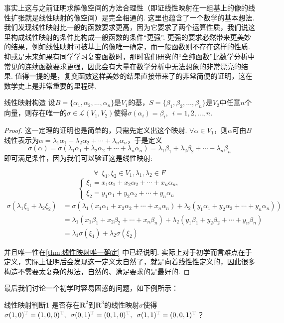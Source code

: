事实上这与之前证明求解像空间的方法合理性（即证线性映射在一组基上的像的线性扩张就是线性映射的像空间）是完全相通的. 这里也蕴含了一个数学的基本想法. 我们发现线性映射比一般的函数要求更高，因为它要求了两个运算性质，我们说这里构成线性映射的条件比构成一般函数的条件``更强''. 更强的要求必然带来更美妙的结果，例如线性映射可被基上的像唯一确定，而一般函数则不存在这样的性质. 抑或是未来如果有同学学习复变函数时，那时我们研究的``全纯函数''比数学分析中常见的连续函数要求更强，因此会有大量在数学分析中无法想象的非常漂亮的结果. 值得一提的是，复变函数这样美妙的结果直接带来了的非常简便的证明，这在数学史上是非常重要的里程碑.

\begin{theorem}{}{线性映射构造}
    设$B=\{\alpha_1,\alpha_2,\ldots,\alpha_n\}$是$V_1$的基，$S=\{\beta_1,\beta_2,\ldots,\beta_n\}$是$V_2$中任意$n$个向量，则存在唯一的$\sigma\in \mathcal{L}(V_1,V_2)$使得$\sigma(\alpha_i)=\beta_i,\enspace i=1,2,\ldots,n$.
\end{theorem}

\begin{proof}
这一定理的证明也是简单的，只需先定义出这个映射. $\forall \alpha \in V_1$，则$\alpha$可由$B$线性表示为$\alpha=\lambda_1\alpha_1+\lambda_2\alpha_2+\cdots+\lambda_n\alpha_n$，于是定义
\[\sigma(\alpha)=\sigma(\lambda_1\alpha_1+\lambda_2\alpha_2+\cdots+\lambda_n\alpha_n)=\lambda_1\beta_1+\lambda_2\beta_2+\cdots+\lambda_n\beta_n\]
即可满足条件，因为我们可以验证这是线性映射:

\[
\forall \enspace \xi_1, \xi_2 \in V_1, \lambda_1, \lambda_2 \in F
\]
\[
\begin{cases}
    \xi_1 = x_1\alpha_1+x_2\alpha_2+\cdots+x_n\alpha_n,\\
    \xi_2 = y_1\alpha_1+y_2\alpha_2+\cdots+y_n\alpha_n
\end{cases}
\]
\begin{align*}
\sigma(\lambda_1 \xi_1 + \lambda_2 \xi_2) &= \sigma(\lambda_1(x_1\alpha_1+x_2\alpha_2+\cdots+x_n\alpha_n) + \lambda_2(y_1\alpha_1+y_2\alpha_2+\cdots+y_n\alpha_n))\\
&= \lambda_1(x_1\beta_1+x_2\beta_2+\cdots+x_n\beta_n) + \lambda_2(y_1\beta_1+y_2\beta_2+\cdots+y_n\beta_n)\\
&= \lambda_1\sigma(\xi_1) + \lambda_2\sigma(\xi_2)
\end{align*}

并且唯一性在\autoref{thm:线性映射唯一确定} 中已经说明. 实际上对于初学而言难点在于定义，实际上证明后会发现这一定义太自然了，就是向着线性性定义的，因此很多构造不需要太复杂的想法，自然的、满足要求的是最好的.
\end{proof}
最后我们讨论一个初学时容易困惑的问题，如下例所示：
\begin{example}{}{线性映射判断1}
    是否存在$\mathbf{R}^2$到$\mathbf{R}^3$的线性映射$\sigma$使得$\sigma(1,0)^{\color{lightgray}\mathrm{T}}=(1,0,0)^{\color{lightgray}\mathrm{T}},\enspace\sigma(0,1)^{\color{lightgray}\mathrm{T}}=(0,1,0)^{\color{lightgray}\mathrm{T}},\enspace\sigma(1,1)^{\color{lightgray}\mathrm{T}}=(0,0,1)^{\color{lightgray}\mathrm{T}}$？
\end{example}

